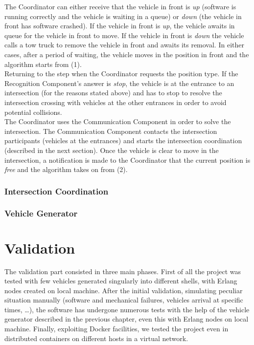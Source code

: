 \documentclass{memoir}
\begin{document}
The Coordinator can either receive that the vehicle in front is \textit{up} (software is running correctly and the vehicle is waiting in a queue) or  \textit{down} (the vehicle in front has software crashed). If the vehicle in front is \textit{up}, the vehicle awaits in queue for the vehicle in front to move. If the vehicle in front is \textit{down} the vehicle calls a tow truck to remove the vehicle in front and awaits its removal.
In either cases, after a period of waiting, the vehicle moves in the position in front and the algorithm starts from (1).
\\

Returning to the step when the Coordinator requests the position type. If the Recognition Component’s answer is \textit{stop}, the vehicle is at the entrance to an intersection (for the reasons stated above) and has to stop to resolve the intersection crossing with vehicles at the other entrances in order to avoid potential collisions.
\\

The Coordinator uses the Communication Component in order to solve the intersection. The Communication Component contacts the intersection participants (vehicles at the entrances) and starts the intersection coordination (described in the next section). Once the vehicle is clear to move in the intersection, a notification is made to the Coordinator that the current position is \textit{free} and the algorithm takes on from (2).

\subsection{Intersection Coordination}

\subsection{Vehicle Generator}


\chapter{Validation}
The validation part consisted in three main phases. First of all the project was tested with few vehicles generated singularly into different shells, with Erlang nodes created on local machine. After the initial validation, simulating peculiar situation manually (software and mechanical failures, vehicles arrival at specific times, \dots), the software has undergone numerous tests with the help of the vehicle generator described in the previous chapter, even this with Erlang nodes on local machine. Finally, exploiting Docker facilities, we tested the project even in distributed containers on different hosts in a virtual network.
\end{document}
